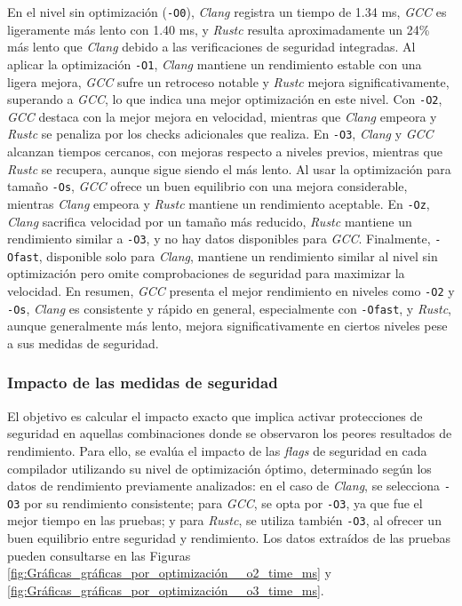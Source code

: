 En el nivel sin optimización (\texttt{-O0}), \emph{Clang} registra un tiempo de 1.34 ms, \emph{GCC} es ligeramente más lento con 1.40 ms, y \emph{Rustc} resulta aproximadamente un 24\% más lento que \emph{Clang} debido a las verificaciones de seguridad integradas. Al aplicar la optimización \texttt{-O1}, \emph{Clang} mantiene un rendimiento estable con una ligera mejora, \emph{GCC} sufre un retroceso notable y \emph{Rustc} mejora significativamente, superando a \emph{GCC}, lo que indica una mejor optimización en este nivel. Con \texttt{-O2}, \emph{GCC} destaca con la mejor mejora en velocidad, mientras que \emph{Clang} empeora y \emph{Rustc} se penaliza por los checks adicionales que realiza. En \texttt{-O3}, \emph{Clang} y \emph{GCC} alcanzan tiempos cercanos, con mejoras respecto a niveles previos, mientras que \emph{Rustc} se recupera, aunque sigue siendo el más lento. Al usar la optimización para tamaño \texttt{-Os}, \emph{GCC} ofrece un buen equilibrio con una mejora considerable, mientras \emph{Clang} empeora y \emph{Rustc} mantiene un rendimiento aceptable. En \texttt{-Oz}, \emph{Clang} sacrifica velocidad por un tamaño más reducido, \emph{Rustc} mantiene un rendimiento similar a \texttt{-O3}, y no hay datos disponibles para \emph{GCC}. Finalmente, \texttt{-Ofast}, disponible solo para \emph{Clang}, mantiene un rendimiento similar al nivel sin optimización pero omite comprobaciones de seguridad para maximizar la velocidad. En resumen, \emph{GCC} presenta el mejor rendimiento en niveles como \texttt{-O2} y \texttt{-Os}, \emph{Clang} es consistente y rápido en general, especialmente con \texttt{-Ofast}, y \emph{Rustc}, aunque generalmente más lento, mejora significativamente en ciertos niveles pese a sus medidas de seguridad.


\subsubsection{Impacto de las medidas de seguridad}

El objetivo es calcular el impacto exacto que implica activar protecciones de seguridad en aquellas combinaciones donde se observaron los peores resultados de rendimiento. Para ello, se evalúa el impacto de las \emph{flags} de seguridad en cada compilador utilizando su nivel de optimización óptimo, determinado según los datos de rendimiento previamente analizados: en el caso de \emph{Clang}, se selecciona \texttt{-O3} por su rendimiento consistente; para \emph{GCC}, se opta por \texttt{-O3}, ya que fue el mejor tiempo en las pruebas; y para \emph{Rustc}, se utiliza también \texttt{-O3}, al ofrecer un buen equilibrio entre seguridad y rendimiento. Los datos extraídos de las pruebas pueden consultarse en las Figuras \ref{fig:Gráficas_gráficas_por_optimización__o2_time_ms} y \ref{fig:Gráficas_gráficas_por_optimización__o3_time_ms}.

